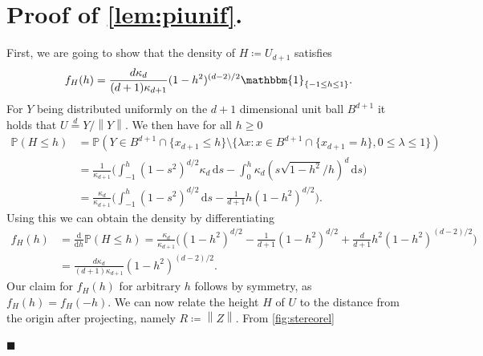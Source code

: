 \documentclass[11pt]{article}%
\newenvironment{proofof}[1]{\vspace{1ex}\noindent{\bf Proof of #1.}}{\hspace*{\fill}$\blacksquare$\vspace{1ex}}
\newcommand{\norm}[1]{\ensuremath{\left\|#1\right\|}}
\newcommand{\Pro}{\mathbb{P}}
\newcommand{\indicator}[1]{\mathbbm{1}_{\{#1\}}}
\begin{document}
\section{Proof of \cref{lem:piunif}.}\label{proof:piunif}
\begin{proofof}{\cref{lem:piunif}}
First, we are going to show that the density of $ H\coloneqq U_{d+1} $ satisfies
	\begin{equation*}
		f_{H}(h)=\frac{d\kappa_d}{(d+1)\kappa_{d+1}}(1-h^2)^{(d-2)/2}\indicator{-1\leq h\leq 1}.
	\end{equation*}
	For $ Y $ being distributed uniformly on the $ d+1 $ dimensional unit ball $ B^{d+1} $ it holds that $ U\stackrel{d}{=}Y/\norm{Y} $. We then have for all $ h\geq 0 $
	\begin{equation*}
		\begin{split}
			\Pro(H\leq h)&=\Pro(Y\in B^{d+1}\cap\{x_{d+1}\leq h \}\setminus \{\lambda x :x\in B^{d+1}\cap \{x_{d+1}= h\},0\leq \lambda\leq 1 \})
			\\&=\frac{1}{\kappa_{d+1}}\bigg(\int_{-1}^{h}(1-s^2)^{d/2}\kappa_d\,\text{d}s-\int_{0}^{h}\kappa_d(s\sqrt{1-h^2}/h)^d\,\text{d}s\bigg)\\&=\frac{\kappa_d}{\kappa_{d+1}}\bigg(\int_{-1}^{h}(1-s^2)^{d/2}\,\text{d}s-\frac{1}{d+1}h(1-h^2)^{d/2}\bigg).
		\end{split}
	\end{equation*}
Using this we can obtain the density by differentiating 
\begin{equation*}
    \begin{split}
        f_H(h)&=\frac{\text{d}}{\text{d} h}\Pro(H\leq h)=\frac{\kappa_d}{\kappa_{d+1}}\bigg((1-h^2)^{d/2}-\frac{1}{d+1}(1-h^2)^{d/2}+\frac{d}{d+1}h^2(1-h^2)^{(d-2)/2}\bigg)
			\\&=\frac{d\kappa_d}{(d+1)\kappa_{d+1}}(1-h^2)^{(d-2)/2}.
    \end{split}
\end{equation*}
Our claim for $ f_{H}(h)$ for arbitrary $ h $ follows by symmetry, as $ f_{H}(h)=f_{H}(-h) $. We can now relate the height $ H $ of $ U $ to the distance from the origin after projecting, namely $ R\coloneqq \norm{Z} $. 
From \cref{fig:stereorel}

\begin{figure}[h!]
\centering
\begin{tikzpicture}[scale=2,
	axis/.style={very thin, gray,->},
	hidden/.style={gray, dashed},
	point/.style={fill=black,circle,inner sep=1.3pt},
	projline/.style={->,red!70},
	every label/.style={font=\small}
	]


\end{tikzpicture}
\end{figure}
\end{proofof}
\end{document}
